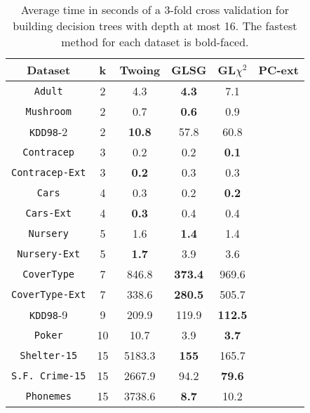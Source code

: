 \begin{table}[]
\small
\caption{Average time in seconds of a 3-fold cross validation
for building decision trees with depth at most 16.
The fastest method for each dataset is bold-faced.}
\centering
\begin{tabular}{c|c|c|c|c|c}
Dataset             & k  & Twoing        & GLSG      & GL$\chi^2$  & PC-ext \\ \hline
{\tt Adult}         & 2  & 4.3           & {\bf 4.3} & 7.1         &        \\
{\tt Mushroom}      & 2  & 0.7           & {\bf 0.6} & 0.9         &        \\
{\tt KDD98}-2       & 2  & {\bf 10.8}    & 57.8      & 60.8        &        \\
{\tt Contracep}     & 3  & 0.2           & 0.2       & {\bf 0.1}   &        \\
{\tt Contracep-Ext} & 3  & {\bf 0.2}     & 0.3       & 0.3         &        \\
{\tt Cars}          & 4  & 0.3           & 0.2       & {\bf 0.2}   &        \\
{\tt Cars-Ext}      & 4  & {\bf 0.3}     & 0.4       & 0.4         &        \\
{\tt Nursery}       & 5  & 1.6           &  {\bf 1.4}      &  1.4  &        \\
{\tt Nursery-Ext}   & 5  & {\bf 1.7}           &  3.9 & 3.6        &        \\
{\tt CoverType}     & 7  & 846.8         &{\bf 373.4}& 969.6       &        \\
{\tt CoverType-Ext} & 7  & 338.6         &{\bf 280.5}& 505.7       &        \\
{\tt KDD98}-9       & 9  & 209.9         & 119.9     & {\bf 112.5} &        \\
{\tt Poker}         & 10 & 10.7          & 3.9       & {\bf 3.7}   &        \\ 
{\tt Shelter-15}    & 15 & 5183.3        &{\bf 155}  & 165.7       &        \\   
{\tt S.F. Crime-15} & 15 & 2667.9        & 94.2      &{\bf 79.6}   &        \\ 
{\tt Phonemes}      & 15 & 3738.6        &{\bf 8.7}  & 10.2        &
\end{tabular}
\label{tab:time}
\end{table}


